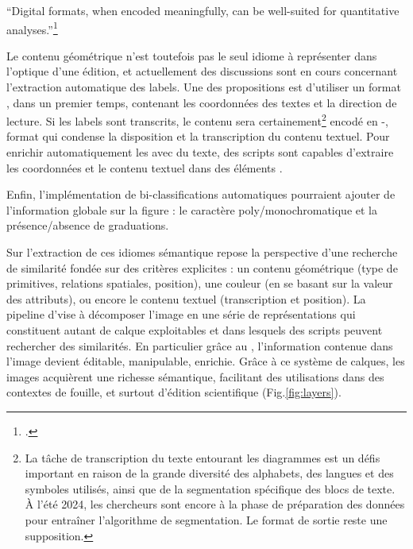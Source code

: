 \begin{kwote}                            
``Digital formats, when encoded meaningfully, can be well-suited for
quantitative analyses.''\footcite[p.82]{roughan_digital_2014}
\end{kwote}  

Le contenu géométrique n'est toutefois pas le seul idiome à représenter
dans l'optique d'une édition, et actuellement des discussions sont en
cours concernant l'extraction automatique des labels. Une des
propositions est d'utiliser un format \json, dans un premier temps,
contenant les coordonnées des textes et la direction de lecture. Si les
labels sont transcrits, le contenu sera certainement\footnote{La tâche
  de transcription du texte entourant les diagrammes est un défis
  important en raison de la grande diversité des alphabets, des langues
  et des symboles utilisés, ainsi que de la segmentation spécifique des
  blocs de texte. À l'été 2024, les chercheurs sont encore à la phase de
  préparation des données pour entraîner l'algorithme de segmentation.
 Le format de sortie reste une supposition.} encodé en \xml-\alto,
format qui condense la disposition et la transcription du contenu
textuel. Pour enrichir automatiquement les \svgs avec du texte, des
scripts sont capables d'extraire les coordonnées et le contenu textuel
dans des éléments \svg.

Enfin, l'implémentation de bi-classifications automatiques pourraient
ajouter de l'information globale sur la figure : le caractère
poly/monochromatique et la présence/absence de graduations.

Sur l'extraction de ces idiomes sémantique repose la perspective d'une
recherche de similarité fondée sur des critères explicites : un contenu
géométrique (type de primitives, relations spatiales, position), une
couleur (en se basant sur la valeur des attributs), ou encore le contenu
textuel (transcription et position). La pipeline d'\eida vise à
décomposer l'image en une série de représentations qui constituent
autant de calque exploitables et dans lesquels des scripts peuvent
rechercher des similarités. En particulier grâce au \svg, l'information
contenue dans l'image devient éditable, manipulable, enrichie. Grâce à
ce système de calques, les images acquièrent une richesse sémantique,
facilitant des utilisations dans des contextes de fouille, et surtout
d'édition scientifique (Fig.\ref{fig:layers}).

